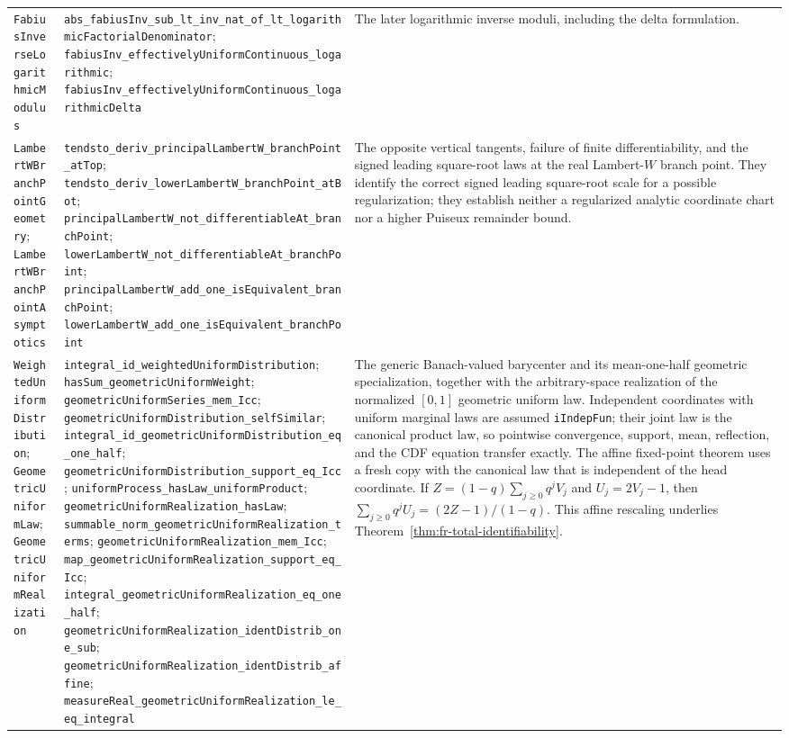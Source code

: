 \begin{longtable}{@{}>{\raggedright\arraybackslash}p{}>{\raggedright\arraybackslash}p{}>{\raggedright\arraybackslash}p{}@{}}
\nolinkurl{FabiusInverseLogarithmicModulus}
&
\nolinkurl{abs_fabiusInv_sub_lt_inv_nat_of_lt_logarithmicFactorialDenominator};
\nolinkurl{fabiusInv_effectivelyUniformContinuous_logarithmic};
\nolinkurl{fabiusInv_effectivelyUniformContinuous_logarithmicDelta}
&
The later logarithmic inverse moduli, including the delta formulation. \\

\nolinkurl{LambertWBranchPointGeometry};
\nolinkurl{LambertWBranchPointAsymptotics}
&
\nolinkurl{tendsto_deriv_principalLambertW_branchPoint_atTop};
\nolinkurl{tendsto_deriv_lowerLambertW_branchPoint_atBot};
\nolinkurl{principalLambertW_not_differentiableAt_branchPoint};
\nolinkurl{lowerLambertW_not_differentiableAt_branchPoint};
\nolinkurl{principalLambertW_add_one_isEquivalent_branchPoint};
\nolinkurl{lowerLambertW_add_one_isEquivalent_branchPoint}
&
The opposite vertical tangents, failure of finite differentiability, and the
signed leading square-root laws at the real Lambert-\(W\) branch point.  They
identify the correct signed leading square-root scale for a possible
regularization; they establish neither a regularized analytic coordinate
chart nor a higher Puiseux remainder bound. \\

\nolinkurl{WeightedUniformDistribution};
\nolinkurl{GeometricUniformLaw};
\nolinkurl{GeometricUniformRealization}
&
\nolinkurl{integral_id_weightedUniformDistribution};
\nolinkurl{hasSum_geometricUniformWeight};
\nolinkurl{geometricUniformSeries_mem_Icc};
\nolinkurl{geometricUniformDistribution_selfSimilar};
\nolinkurl{integral_id_geometricUniformDistribution_eq_one_half};
\nolinkurl{geometricUniformDistribution_support_eq_Icc};
\nolinkurl{uniformProcess_hasLaw_uniformProduct};
\nolinkurl{geometricUniformRealization_hasLaw};
\nolinkurl{summable_norm_geometricUniformRealization_terms};
\nolinkurl{geometricUniformRealization_mem_Icc};
\nolinkurl{map_geometricUniformRealization_support_eq_Icc};
\nolinkurl{integral_geometricUniformRealization_eq_one_half};
\nolinkurl{geometricUniformRealization_identDistrib_one_sub};
\nolinkurl{geometricUniformRealization_identDistrib_affine};
\nolinkurl{measureReal_geometricUniformRealization_le_eq_integral}
&
The generic Banach-valued barycenter and its mean-one-half geometric
specialization, together with the arbitrary-space realization of the
normalized \([0,1]\) geometric uniform law.  Independent coordinates with
uniform marginal laws are assumed \nolinkurl{iIndepFun}; their joint law is
the canonical product law, so pointwise convergence, support, mean,
reflection, and the CDF equation transfer exactly.  The affine fixed-point
theorem uses a fresh copy with the canonical law that is independent of the
head coordinate.  If
\(Z=(1-q)\sum_{j\ge0}q^jV_j\) and \(U_j=2V_j-1\), then
\(\sum_{j\ge0}q^jU_j=(2Z-1)/(1-q)\).  This affine rescaling underlies
Theorem~\ref{thm:fr-total-identifiability}. \\


\end{longtable}
